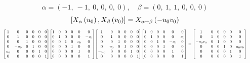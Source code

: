 \documentclass[11pt]{article}
\theoremstyle{definition}
\begin{document}
\[
\alpha = \left( -1, \  -1, \  0, \  0, \  0, \  0\right), \quad \beta = \left( 0, \  1, \  1, \  0, \  0, \  0\right)
\]
\[
\scaletoalign{\textwidth}{\left[ X_{\alpha}\left(u_{0}\right), X_{\beta}\left(v_{0}\right) \right] = X_{\alpha + \beta}\left(- u_{0} v_{0}\right)}
\]
\[
\scaletoalign{\textwidth}{{\left[\begin{matrix}1 & 0 & 0 & 0 & 0 & 0\\0 & 1 & 0 & 0 & 0 & 0\\0 & 0 & 1 & 0 & 0 & 0\\0 & - u_{0} & 0 & 1 & 0 & 0\\u_{0} & 0 & 0 & 0 & 1 & 0\\0 & 0 & 0 & 0 & 0 & 1\end{matrix}\right]} {\left[\begin{matrix}1 & 0 & 0 & 0 & 0 & 0\\0 & 1 & 0 & 0 & 0 & - v_{0}\\0 & 0 & 1 & 0 & v_{0} & 0\\0 & 0 & 0 & 1 & 0 & 0\\0 & 0 & 0 & 0 & 1 & 0\\0 & 0 & 0 & 0 & 0 & 1\end{matrix}\right]} {\left[\begin{matrix}1 & 0 & 0 & 0 & 0 & 0\\0 & 1 & 0 & 0 & 0 & 0\\0 & 0 & 1 & 0 & 0 & 0\\0 & u_{0} & 0 & 1 & 0 & 0\\- u_{0} & 0 & 0 & 0 & 1 & 0\\0 & 0 & 0 & 0 & 0 & 1\end{matrix}\right]} {\left[\begin{matrix}1 & 0 & 0 & 0 & 0 & 0\\0 & 1 & 0 & 0 & 0 & v_{0}\\0 & 0 & 1 & 0 & - v_{0} & 0\\0 & 0 & 0 & 1 & 0 & 0\\0 & 0 & 0 & 0 & 1 & 0\\0 & 0 & 0 & 0 & 0 & 1\end{matrix}\right]} = {\left[\begin{matrix}1 & 0 & 0 & 0 & 0 & 0\\0 & 1 & 0 & 0 & 0 & 0\\- u_{0} v_{0} & 0 & 1 & 0 & 0 & 0\\0 & 0 & 0 & 1 & 0 & u_{0} v_{0}\\0 & 0 & 0 & 0 & 1 & 0\\0 & 0 & 0 & 0 & 0 & 1\end{matrix}\right]}}
\]
\end{document}
